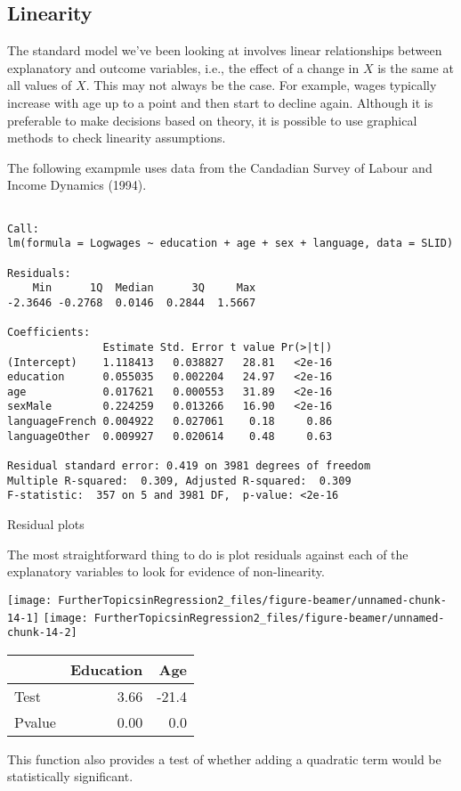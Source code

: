 \documentclass[10pt,ignorenonframetext,]{beamer}
\begin{document}
\subsection{Linearity}\label{linearity}

The standard model we've been looking at involves linear relationships
between explanatory and outcome variables, i.e., the effect of a change
in \(X\) is the same at all values of \(X\). This may not always be the
case. For example, wages typically increase with age up to a point and
then start to decline again. Although it is preferable to make decisions
based on theory, it is possible to use graphical methods to check
linearity assumptions.

The following exampmle uses data from the Candadian Survey of Labour and
Income Dynamics (1994).

\begin{verbatim}

Call:
lm(formula = Logwages ~ education + age + sex + language, data = SLID)

Residuals:
    Min      1Q  Median      3Q     Max 
-2.3646 -0.2768  0.0146  0.2844  1.5667 

Coefficients:
               Estimate Std. Error t value Pr(>|t|)
(Intercept)    1.118413   0.038827   28.81   <2e-16
education      0.055035   0.002204   24.97   <2e-16
age            0.017621   0.000553   31.89   <2e-16
sexMale        0.224259   0.013266   16.90   <2e-16
languageFrench 0.004922   0.027061    0.18     0.86
languageOther  0.009927   0.020614    0.48     0.63

Residual standard error: 0.419 on 3981 degrees of freedom
Multiple R-squared:  0.309, Adjusted R-squared:  0.309 
F-statistic:  357 on 5 and 3981 DF,  p-value: <2e-16
\end{verbatim}

\begin{frame}{Residual plots}

The most straightforward thing to do is plot residuals against each of
the explanatory variables to look for evidence of non-linearity.

\texttt{[image: FurtherTopicsinRegression2\_files/figure-beamer/unnamed-chunk-14-1]}
\texttt{[image: FurtherTopicsinRegression2\_files/figure-beamer/unnamed-chunk-14-2]}

\begin{longtable}[]{@{}lrr@{}}
\toprule
& Education & Age\tabularnewline
\midrule
\endhead
Test & 3.66 & -21.4\tabularnewline
Pvalue & 0.00 & 0.0\tabularnewline
\bottomrule
\end{longtable}

This function also provides a test of whether adding a quadratic term
would be statistically significant.

\end{frame}
\end{document}
